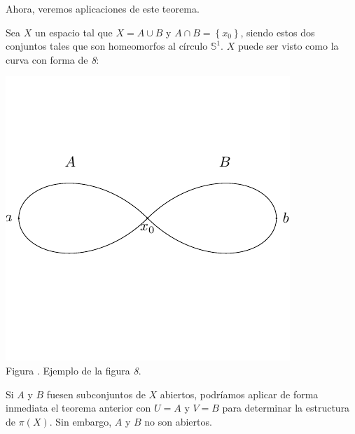 \documentclass[12pt]{report}
\newcounter{it}
\theoremstyle{largebreak}
\newcounter{figcount}
\begin{document}
    Ahora, veremos aplicaciones de este teorema.

    \begin{exa}
        Sea $X$ un espacio tal que $X=A\cup B$ y $A\cap B=\left\{x_0 \right\}$, siendo estos dos conjuntos tales que son homeomorfos al círculo $\mathbb{S}^1$. $X$ puede ser visto como la curva con forma de \textit{8}:

        \begin{minipage}{\textwidth}
            \begin{center}
                \includegraphics[scale=1.5]{images/fig_6.pdf}\\
                Figura \thefigcount. Ejemplo de la figura \textit{8}.
            \end{center}
        \end{minipage}

        Si $A$ y $B$ fuesen subconjuntos de $X$ abiertos, podríamos aplicar de forma inmediata el teorema anterior con $U=A$ y $V=B$ para determinar la estructura de $\pi(X)$. Sin embargo, $A$ y $B$ no son abiertos.


\end{exa}
\end{document}
